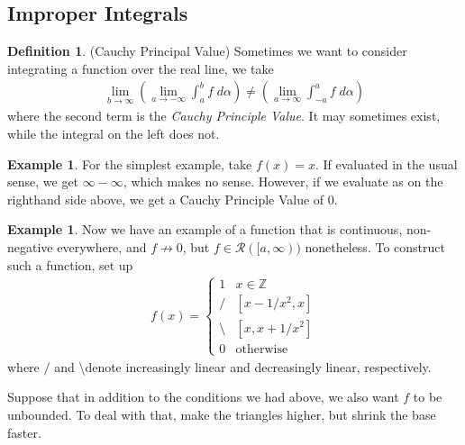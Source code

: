 \documentclass[12pt]{book}
\numberwithin{equation}{section} %
\theoremstyle{plain}
\theoremstyle{definition}
\newtheorem{defn}[thm]{Definition}
\newtheorem{ex}[thm]{Example}
\theoremstyle{remark}
\begin{document}
\newpage
\subsection{Improper Integrals}

\begin{defn}(Cauchy Principal Value)
Sometimes we want to consider integrating a function over the real line,
we take
\begin{align*}
    \lim_{b\rightarrow\infty}
    \left(\lim_{a\rightarrow-\infty} \int^b_a f\;d\alpha
    \right) \neq
    \left(\lim_{a\rightarrow\infty} \int^a_{-a} f\;d\alpha
    \right)
\end{align*}
where the second term is the \emph{Cauchy Principle Value}. It may
sometimes exist, while the integral on the left does not.
\end{defn}

\begin{ex}
For the simplest example, take $f(x)=x$. If evaluated in the usual
sense, we get $\infty-\infty$, which makes no sense. However, if we
evaluate as on the righthand side above, we get a Cauchy Principle Value
of $0$.
\end{ex}

\begin{ex}
Now we have an example of a function that is continuous, non-negative
everywhere, and $f\not\rightarrow 0$, but $f\in\mathscr{R}([a,\infty))$
nonetheless.  To construct such a function, set up
\begin{align*}
  f(x) =
  \begin{cases}
      1 & x\in\mathbb{Z} \\
      / & [x - 1/x^2, x] \\
      \text{\textbackslash} & [x, x + 1/x^2] \\
      0 & \text{otherwise}
  \end{cases}
\end{align*}
where $/$ and \textbackslash denote increasingly linear and decreasingly
linear, respectively.

Suppose that in addition to the conditions we had above, we also want
$f$ to be unbounded. To deal with that, make the triangles higher, but
shrink the base faster.
\end{ex}
\end{document}
